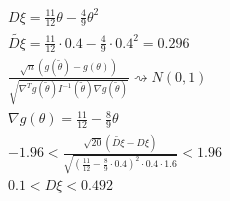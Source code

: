 \documentclass{article}
\begin{document}
\begin{eg}
\begin{enumerate}
\begin{gather*}
        D\xi=\frac{11}{12}\theta-\frac{4}{9}\theta^{2} \\ 
        \tilde{D\xi}=\frac{11}{12}\cdot 0.4 - \frac{4}{9} \cdot 0.4 ^{2}=0.296 \\
        \frac{\sqrt{n}(g(\tilde{{\theta}})-g({\theta}))}{\sqrt{\nabla ^{T} g(\tilde{{\theta}})I^{-1}(\tilde{{\theta}})\nabla g(\tilde{{\theta}})}} \rightsquigarrow N(0,1) \\ 
        \nabla g(\theta)=\frac{11}{12}-\frac{8}{9}\theta \\ 
        -1.96 < \frac{\sqrt{20}(\tilde{D\xi}-D\xi)}{\sqrt{(\frac{11}{12}-\frac{8}{9}\cdot 0.4)^{2}\cdot 0.4 \cdot 1.6}} < 1.96 \\ 
        0.1 < D\xi < 0.492
      \end{gather*}
  \end{enumerate}
\end{eg}
\end{document}

